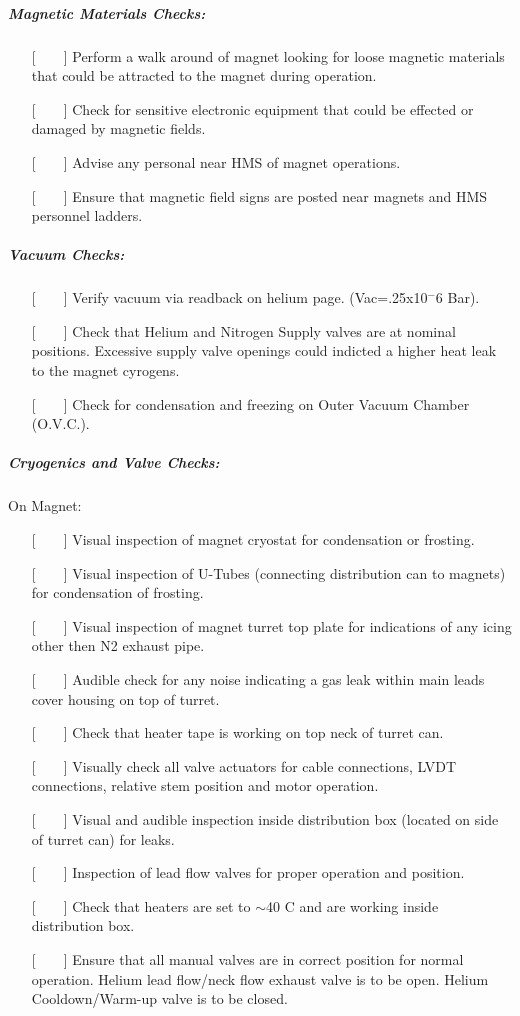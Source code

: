 {\subparagraph{Magnetic Materials Checks:}

\begin{itemize}
\item[{[~~~~]}]{Perform a walk around of magnet looking for loose magnetic
materials that could be attracted to the magnet during operation.}
\item[{[~~~~]}]{Check for sensitive electronic equipment that could be
effected or damaged by magnetic fields.}
\item[{[~~~~]}]{Advise any personal near HMS of magnet operations.}
\item[{[~~~~]}]{Ensure that magnetic field signs are posted near magnets
and HMS personnel ladders.}
\end{itemize}


\subparagraph{Vacuum Checks:}

\begin{itemize}
\item[{[~~~~]}]{Verify vacuum via readback on helium page.  (Vac=.25x10${^-6}$ Bar).}
\item[{[~~~~]}]{Check that Helium and Nitrogen Supply valves are at nominal
positions.  Excessive supply valve openings could indicted a higher heat
leak to the magnet cyrogens.}
\item[{[~~~~]}]{Check for condensation and freezing on Outer Vacuum
Chamber (O.V.C.).}
\end{itemize}

\subparagraph{Cryogenics and Valve Checks:}

\noindent On Magnet:

\begin{itemize}
\item[{[~~~~]}]{Visual inspection of magnet cryostat for condensation or frosting.}
\item[{[~~~~]}]{Visual inspection of U-Tubes (connecting distribution can to
magnets) for condensation of frosting.}
\item[{[~~~~]}]{Visual inspection of magnet turret top plate for indications
of any icing other then N2 exhaust pipe.}
\item[{[~~~~]}]{Audible check for any noise indicating a gas leak within main
leads cover housing on top of turret.}
\item[{[~~~~]}]{Check that heater tape is working on top neck of turret can.}
\item[{[~~~~]}]{Visually check all valve actuators for cable connections, LVDT
connections, relative stem position and motor operation.}
\item[{[~~~~]}]{Visual and audible inspection inside distribution box
(located on side of turret can) for leaks.}
\item[{[~~~~]}]{Inspection of lead flow valves for proper operation and position.}
\item[{[~~~~]}]{Check that heaters are set to $\sim$40 C and are working inside
distribution box.}
\item[{[~~~~]}]{Ensure that all manual valves are in correct position for normal
operation.  Helium lead flow/neck flow exhaust valve is to be open. Helium
Cooldown/Warm-up valve is to be closed.}
\end{itemize}

}
